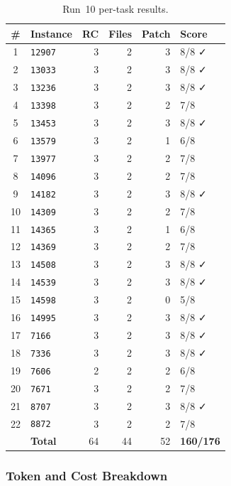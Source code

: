 \begin{table}[h]
\centering
\small
\caption{Run~10 per-task results.}\label{tab:r10-tasks}
\setlength{\tabcolsep}{4pt}
\begin{tabular}{clrrrl}
\toprule
\textbf{\#} & \textbf{Instance} & \textbf{RC} & \textbf{Files} & \textbf{Patch} & \textbf{Score} \\
\midrule
 1 & \texttt{12907} & 3 & 2 & 3 & 8/8 ✓ \\
 2 & \texttt{13033} & 3 & 2 & 3 & 8/8 ✓ \\
 3 & \texttt{13236} & 3 & 2 & 3 & 8/8 ✓ \\
 4 & \texttt{13398} & 3 & 2 & 2 & 7/8 \\
 5 & \texttt{13453} & 3 & 2 & 3 & 8/8 ✓ \\
 6 & \texttt{13579} & 3 & 2 & 1 & 6/8 \\
 7 & \texttt{13977} & 3 & 2 & 2 & 7/8 \\
 8 & \texttt{14096} & 3 & 2 & 2 & 7/8 \\
 9 & \texttt{14182} & 3 & 2 & 3 & 8/8 ✓ \\
10 & \texttt{14309} & 3 & 2 & 2 & 7/8 \\
11 & \texttt{14365} & 3 & 2 & 1 & 6/8 \\
12 & \texttt{14369} & 3 & 2 & 2 & 7/8 \\
13 & \texttt{14508} & 3 & 2 & 3 & 8/8 ✓ \\
14 & \texttt{14539} & 3 & 2 & 3 & 8/8 ✓ \\
15 & \texttt{14598} & 3 & 2 & 0 & 5/8 \\
16 & \texttt{14995} & 3 & 2 & 3 & 8/8 ✓ \\
17 & \texttt{7166}  & 3 & 2 & 3 & 8/8 ✓ \\
18 & \texttt{7336}  & 3 & 2 & 3 & 8/8 ✓ \\
19 & \texttt{7606}  & 2 & 2 & 2 & 6/8 \\
20 & \texttt{7671}  & 3 & 2 & 2 & 7/8 \\
21 & \texttt{8707}  & 3 & 2 & 3 & 8/8 ✓ \\
22 & \texttt{8872}  & 3 & 2 & 2 & 7/8 \\
\midrule
   & \textbf{Total} & 64 & 44 & 52 & \textbf{160/176} \\
\bottomrule
\end{tabular}
\end{table}

\subsubsection{Token and Cost Breakdown}

